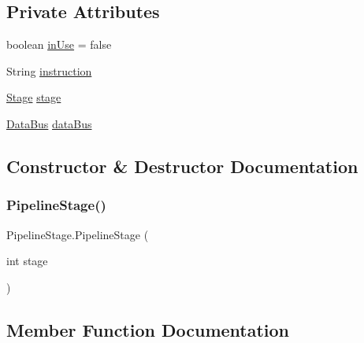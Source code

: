 \subsection*{Private Attributes}
\begin{DoxyCompactItemize}
\item 
boolean \mbox{\hyperlink{class_pipeline_stage_a3ac73b767158fba9e6875514845d1d97}{in\+Use}} = false
\item 
String \mbox{\hyperlink{class_pipeline_stage_a489ee0d4b3d0eee31ec60b9cb24a0e36}{instruction}}
\item 
\mbox{\hyperlink{enum_stage}{Stage}} \mbox{\hyperlink{class_pipeline_stage_a8e9a5f7315a4d88213c4ad0949048f34}{stage}}
\item 
\mbox{\hyperlink{class_data_bus}{Data\+Bus}} \mbox{\hyperlink{class_pipeline_stage_abf7e2ce98acaa474f4be90e14fda0f26}{data\+Bus}}
\end{DoxyCompactItemize}


\subsection{Constructor \& Destructor Documentation}
\mbox{\label{class_pipeline_stage_af608b65a2a3bb7d9fcf3d860152104a2}} 
\subsubsection{\texorpdfstring{Pipeline\+Stage()}{PipelineStage()}}
{\footnotesize\ttfamily Pipeline\+Stage.\+Pipeline\+Stage (\begin{DoxyParamCaption}\item[{int}]{stage }\end{DoxyParamCaption})\hspace{0.3cm}{\ttfamily [package]}}



\subsection{Member Function Documentation}
\mbox{\label{class_pipeline_stage_a132fd57aa34d80eb12ac7b228d29d32e}} 

